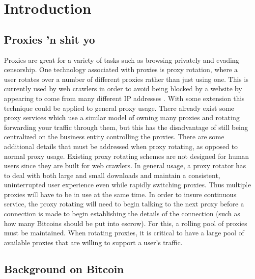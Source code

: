 \section{Introduction}
\label{sec:intro}

\subsection{Proxies 'n shit yo}

Proxies are great for a variety of tasks such as browsing privately and evading censorship. One technology associated with proxies is proxy rotation, where a user rotates over a number of different proxies rather than just using one. This is currently used by web crawlers in order to avoid being blocked by a website by appearing to come from many different IP addresses . With some extension this technique could be applied to general proxy usage. There already exist some proxy services which use a similar model of owning many proxies and rotating forwarding your traffic through them, but this has the disadvantage of still being centralized on the business entity controlling the proxies. There are some additional details that must be addressed when proxy rotating, as opposed to normal proxy usage. Existing proxy rotating schemes are not designed for human users since they are built for web crawlers. In general usage, a proxy rotator has to deal with both large and small downloads and maintain a consistent, uninterrupted user experience even while rapidly switching proxies. Thus multiple proxies will have to be in use at the same time. In order to insure continuous service, the proxy rotating will need to begin talking to the next proxy before a connection is made to begin establishing the details of the connection (such as how many Bitcoins should be put into escrow). For this, a rolling pool of proxies must be maintained. When rotating proxies, it is critical to have a large pool of available proxies that are willing to support a user's traffic.

\subsection{Background on Bitcoin}


